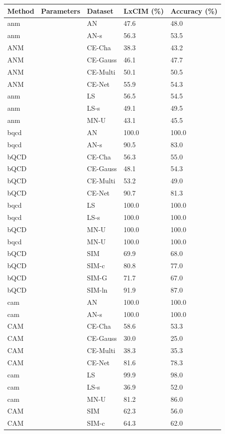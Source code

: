 \begin{tabular}{lllll}
\toprule
Method & Parameters & Dataset & LxCIM (\%) & Accuracy (\%) \\
\midrule
anm &  & AN & 47.6 & 48.0 \\
anm &  & AN-s & 56.3 & 53.5 \\
ANM &  & CE-Cha & 38.3 & 43.2 \\
ANM &  & CE-Gauss & 46.1 & 47.7 \\
ANM &  & CE-Multi & 50.1 & 50.5 \\
ANM &  & CE-Net & 55.9 & 54.3 \\
anm &  & LS & 56.5 & 54.5 \\
anm &  & LS-s & 49.1 & 49.5 \\
anm &  & MN-U & 43.1 & 45.5 \\
bqcd &  & AN & 100.0 & 100.0 \\
bqcd &  & AN-s & 90.5 & 83.0 \\
bQCD &  & CE-Cha & 56.3 & 55.0 \\
bQCD &  & CE-Gauss & 48.1 & 54.3 \\
bQCD &  & CE-Multi & 53.2 & 49.0 \\
bQCD &  & CE-Net & 90.7 & 81.3 \\
bqcd &  & LS & 100.0 & 100.0 \\
bqcd &  & LS-s & 100.0 & 100.0 \\
bQCD &  & MN-U & 100.0 & 100.0 \\
bqcd &  & MN-U & 100.0 & 100.0 \\
bQCD &  & SIM & 69.9 & 68.0 \\
bQCD &  & SIM-c & 80.8 & 77.0 \\
bQCD &  & SIM-G & 71.7 & 67.0 \\
bQCD &  & SIM-ln & 91.9 & 87.0 \\
cam &  & AN & 100.0 & 100.0 \\
cam &  & AN-s & 100.0 & 100.0 \\
CAM &  & CE-Cha & 58.6 & 53.3 \\
CAM &  & CE-Gauss & 30.0 & 25.0 \\
CAM &  & CE-Multi & 38.3 & 35.3 \\
CAM &  & CE-Net & 81.6 & 78.3 \\
cam &  & LS & 99.9 & 98.0 \\
cam &  & LS-s & 36.9 & 52.0 \\
cam &  & MN-U & 81.2 & 86.0 \\
CAM &  & SIM & 62.3 & 56.0 \\
CAM &  & SIM-c & 64.3 & 62.0 \\

\end{tabular}
